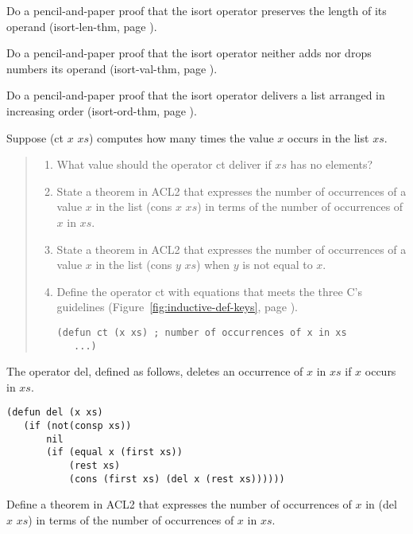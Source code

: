 \begin{ExerciseList}
\Exercise
Do a pencil-and-paper proof that the isort operator
preserves the length of its operand
(isort-len-thm, page \pageref{defthm:isort-len}).

\Exercise
Do a pencil-and-paper proof that the isort operator
neither adds nor drops numbers its operand
(isort-val-thm, page \pageref{defthm:isort-val}).

\Exercise
Do a pencil-and-paper proof that the isort operator
delivers a list arranged in increasing order
(isort-ord-thm, page \pageref{defthm:isort-ord-thm}).

\Exercise
Suppose (ct $x$ $xs$) computes how many times
the value $x$ occurs in the list $xs$.
\begin{quote}
\begin{enumerate}[label=\alph*{. }]
\item What value should the operator ct deliver if $xs$ has no elements?
\item State a theorem in ACL2 that expresses the
      number of occurrences of a value $x$ in the list (cons $x$ $xs$)
      in terms of the number of occurrences of $x$ in $xs$.
\item State a theorem in ACL2 that expresses the
      number of occurrences of a value $x$ in the list (cons $y$ $xs$)
      when $y$ is not equal to $x$.
\item Define the operator ct with equations that meets the three C's guidelines
      (Figure~\ref{fig:inductive-def-keys}, page \pageref{fig:inductive-def-keys}).
\begin{verbatim}
(defun ct (x xs) ; number of occurrences of x in xs
   ...)
\end{verbatim}
\end{enumerate}
\end{quote}

\Exercise
The operator del, defined as follows, deletes an occurrence of $x$ in $xs$
if $x$ occurs in $xs$.
\label{defun:del}
\begin{Verbatim}
(defun del (x xs)
   (if (not(consp xs))
       nil
       (if (equal x (first xs))
           (rest xs)
           (cons (first xs) (del x (rest xs))))))
\end{Verbatim}
Define a theorem in ACL2 that
expresses the number of occurrences of $x$ in (del $x$ $xs$)
in terms of the number of occurrences of $x$ in $xs$.


\end{ExerciseList}
